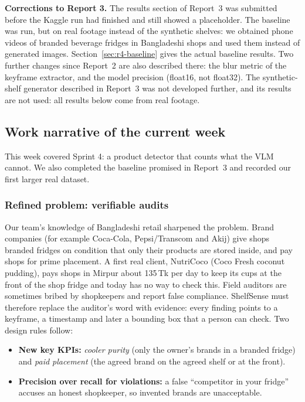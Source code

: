 \textbf{Corrections to Report 3.} The results section of Report~3 was submitted before the Kaggle
run had finished and still showed a placeholder. The baseline was run, but on real footage instead of
the synthetic shelves: we obtained phone videos of branded beverage fridges in Bangladeshi shops and
used them instead of generated images. Section~\ref{sec:r4-baseline} gives the actual baseline
results. Two further changes since Report~2 are also described there: the blur metric of the keyframe
extractor, and the model precision (float16, not float32).
The synthetic-shelf generator described in Report~3 was not developed further, and its results are
not used: all results below come from real footage.

\subsection{Work narrative of the current week}
This week covered Sprint 4: a product detector that counts what the VLM cannot. We also completed
the baseline promised in Report~3 and recorded our first larger real dataset.

\subsubsection{Refined problem: verifiable audits}
Our team's knowledge of Bangladeshi retail sharpened the problem. Brand companies (for example
Coca-Cola, Pepsi/Transcom and Akij) give shops branded fridges on condition that only their
products are stored inside, and pay shops for prime placement. A first real client, NutriCoco
(Coco Fresh coconut pudding), pays shops in Mirpur about 135\,Tk per day to keep its cups at the
front of the shop fridge and today has no way to check this. Field auditors are sometimes bribed by
shopkeepers and report false compliance. ShelfSense must therefore replace the auditor's word with
evidence: every finding points to a keyframe, a timestamp and later a bounding box that a person can
check. Two design rules follow:
\begin{itemize}
  \item \textbf{New key KPIs:} \emph{cooler purity} (only the owner's brands in a branded fridge)
  and \emph{paid placement} (the agreed brand on the agreed shelf or at the front).
  \item \textbf{Precision over recall for violations:} a false ``competitor in your fridge''
  accuses an honest shopkeeper, so invented brands are unacceptable.
\end{itemize}

